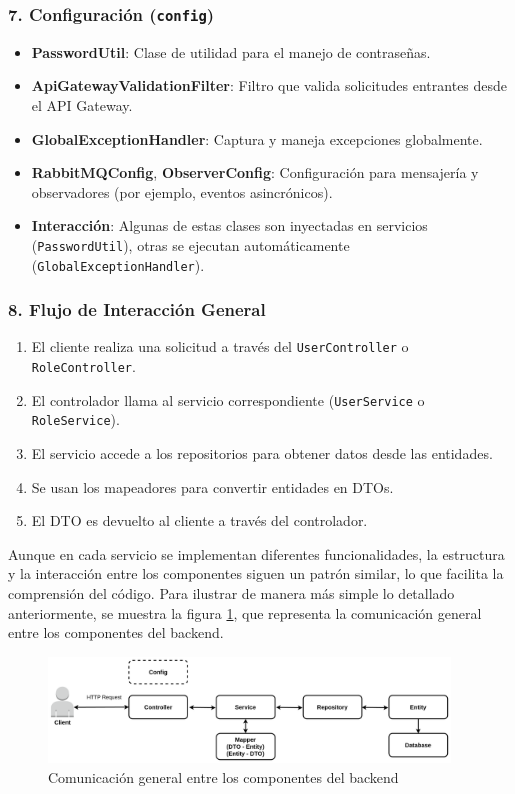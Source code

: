 \subsubsection*{7. Configuración (\texttt{config})}

\begin{itemize}
  \item \textbf{PasswordUtil}: Clase de utilidad para el manejo de contraseñas.
  \item \textbf{ApiGatewayValidationFilter}: Filtro que valida solicitudes entrantes desde el API Gateway.
  \item \textbf{GlobalExceptionHandler}: Captura y maneja excepciones globalmente.
  \item \textbf{RabbitMQConfig}, \textbf{ObserverConfig}: Configuración para mensajería y observadores (por ejemplo, eventos asincrónicos).
  \item \textbf{Interacción}: Algunas de estas clases son inyectadas en servicios (\texttt{PasswordUtil}), otras se ejecutan automáticamente (\texttt{GlobalExceptionHandler}).
\end{itemize}

\subsubsection*{8. Flujo de Interacción General}

\begin{enumerate}
  \item El cliente realiza una solicitud a través del \texttt{UserController} o \texttt{RoleController}.
  \item El controlador llama al servicio correspondiente (\texttt{UserService} o \texttt{RoleService}).
  \item El servicio accede a los repositorios para obtener datos desde las entidades.
  \item Se usan los mapeadores para convertir entidades en DTOs.
  \item El DTO es devuelto al cliente a través del controlador.
\end{enumerate}

Aunque en cada servicio se implementan diferentes funcionalidades, la estructura y la interacción entre los componentes siguen un patrón similar, lo que facilita la comprensión del código.
Para ilustrar de manera más simple lo detallado anteriormente, se muestra la figura \ref{fig:comm}, que representa la comunicación general entre los componentes del backend. 
\begin{figure}[H]
    \centering
    \includegraphics[width=0.95\textwidth]{figures/07_back.png}
    \caption{Comunicación general entre los componentes del backend}
    \label{fig:comm}
\end{figure}

